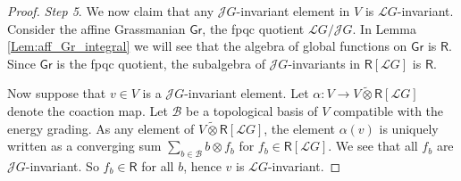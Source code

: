 \documentclass{amsart}
\theoremstyle{definition}
\newcommand{\Ring}{\mathsf{R}}
\newcommand{\g}{\mathfrak{g}}
\newcommand{\hg}{\hat{\mathfrak{g}}}
\newcommand{\Jet}{\mathscr{J}}
\newcommand{\Loop}{\mathscr{L}}
\numberwithin{equation}{section}
\begin{document}
\begin{proof}
{\it Step 5}. We now claim that any $\Jet G$-invariant element in $V$ is $\Loop G$-invariant. Consider the affine Grassmanian $\mathsf{Gr}$, the fpqc quotient  $\Loop G/\Jet G$. In Lemma \ref{Lem:aff_Gr_integral} we will see that the algebra of global functions on $\mathsf{Gr}$ is $\Ring$. Since $\mathsf{Gr}$ is the fpqc quotient, the subalgebra of $\Jet G$-invariants in $\Ring[\Loop G]$ is $\Ring$.

Now suppose that $v\in V$ is a $\Jet G$-invariant element. Let $\alpha:V\rightarrow V\widetilde{\otimes}\Ring[\Loop G]$ denote the coaction map. Let $\mathscr{B}$ be a topological basis of $V$ compatible with the energy grading. As any element 
of $V\widetilde{\otimes}\Ring[\Loop G]$, the element $\alpha(v)$ is uniquely written as a converging sum $\sum_{b\in \mathscr{B}}b\otimes f_b$ for $f_b\in \Ring[\Loop G]$. We see that all $f_b$ are $\Jet G$-invariant. So $f_b\in \Ring$ for all $b$, hence $v$ is $\Loop G$-invariant. 
%
%
%

\end{proof}
\end{document}
